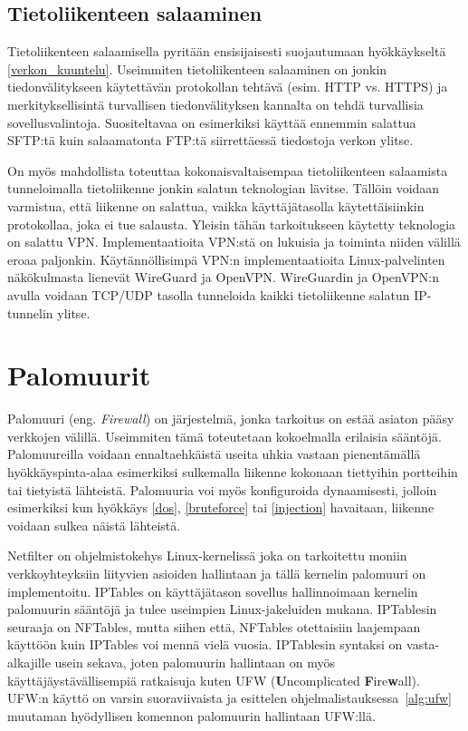 \subsection{Tietoliikenteen salaaminen}\label{tietoliikenteen_salaaminen}

Tietoliikenteen salaamisella pyritään ensisijaisesti suojautumaan hyökkäykseltä \ref{verkon_kuuntelu}. Useimmiten tietoliikenteen salaaminen on jonkin tiedonvälitykseen käytettävän protokollan tehtävä (esim. HTTP vs. HTTPS) ja merkityksellisintä turvallisen tiedonvälityksen kannalta on tehdä turvallisia sovellusvalintoja. Suositeltavaa on esimerkiksi käyttää ennemmin salattua SFTP:tä kuin salaamatonta FTP:tä siirrettäessä tiedostoja verkon ylitse.

On myös mahdollista toteuttaa kokonaisvaltaisempaa tietoliikenteen salaamista tunneloimalla tietoliikenne jonkin salatun teknologian lävitse. Tällöin voidaan varmistua, että liikenne on salattua, vaikka käyttäjätasolla käytettäisiinkin protokollaa, joka ei tue salausta. Yleisin tähän tarkoitukseen käytetty teknologia on salattu VPN. Implementaatioita VPN:stä on lukuisia ja toiminta niiden välillä eroaa paljonkin. Käytännöllisimpä VPN:n implementaatioita Linux-palvelinten näkökulmasta lienevät WireGuard ja OpenVPN. WireGuardin ja OpenVPN:n avulla voidaan TCP/UDP tasolla tunneloida kaikki tietoliikenne salatun IP-tunnelin ylitse.~\cite{ciampa2012security+}

\section{Palomuurit}\label{palomuurit}
Palomuuri (eng. \textit{Firewall}) on järjestelmä, jonka tarkoitus on estää asiaton pääsy verkkojen välillä. Useimmiten tämä toteutetaan kokoelmalla erilaisia sääntöjä. Palomuureilla voidaan ennaltaehkäistä useita uhkia vastaan pienentämällä hyökkäyspinta-alaa esimerkiksi sulkemalla liikenne kokonaan tiettyihin portteihin tai tietyistä lähteistä. Palomuuria voi myös konfiguroida dynaamisesti, jolloin esimerkiksi kun hyökkäys \ref{dos}, \ref{bruteforce} tai \ref{injection} havaitaan, liikenne voidaan sulkea näistä lähteistä.~\cite{ciampa2012security+}

Netfilter on ohjelmistokehys Linux-kernelissä joka on tarkoitettu moniin verkkoyhteyksiin liityvien asioiden hallintaan ja tällä kernelin palomuuri on implementoitu. IPTables on käyttäjätason sovellus hallinnoimaan kernelin palomuurin sääntöjä ja tulee useimpien Linux-jakeluiden mukana. IPTablesin seuraaja on NFTables, mutta siihen että, NFTables otettaisiin laajempaan käyttöön kuin IPTables voi mennä vielä vuosia. IPTablesin syntaksi on vasta-alkajille usein sekava, joten palomuurin hallintaan on myös käyttäjäystävällisempiä ratkaisuja kuten UFW (\textbf{U}ncomplicated \textbf{F}ire\textbf{w}all). UFW:n käyttö on varsin suoraviivaista ja esittelen ohjelmalistauksessa~\ref{alg:ufw} muutaman hyödyllisen komennon palomuurin hallintaan UFW:llä.~\cite{binnie2016linux}~\cite{ufw}


